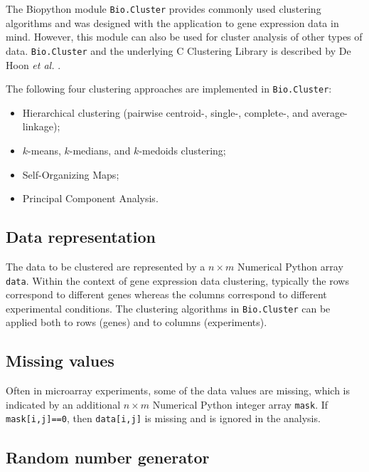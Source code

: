 \documentclass{report}
\begin{document}
The Biopython module \verb|Bio.Cluster| provides commonly used clustering algorithms and was designed with the application to gene expression data in mind. However, this module can also be used for cluster analysis of other types of data. \verb|Bio.Cluster| and the underlying C Clustering Library is described by De Hoon \textit{et al.} \cite{dehoon2004}.

The following four clustering approaches are implemented in \verb|Bio.Cluster|:
\begin{itemize}
\item
Hierarchical clustering (pairwise centroid-, single-, complete-, and average-linkage);
\item
$k$-means, $k$-medians, and $k$-medoids clustering;
\item
Self-Organizing Maps;
\item
Principal Component Analysis.
\end{itemize}

\subsection*{Data representation}

The data to be clustered are represented by a $n \times m$ Numerical Python array \verb|data|. Within the context of gene expression data clustering, typically the rows correspond to different genes whereas the columns correspond to different experimental conditions. The clustering algorithms in \verb|Bio.Cluster| can be applied both to rows (genes) and to columns (experiments).

\subsection*{Missing values}

Often in microarray experiments, some of the data values are missing, which is indicated by an additional $n \times m$ Numerical Python integer array \verb|mask|. If \verb|mask[i,j]==0|, then \verb|data[i,j]| is missing and is ignored in the analysis.

\subsection*{Random number generator}
\end{document}
